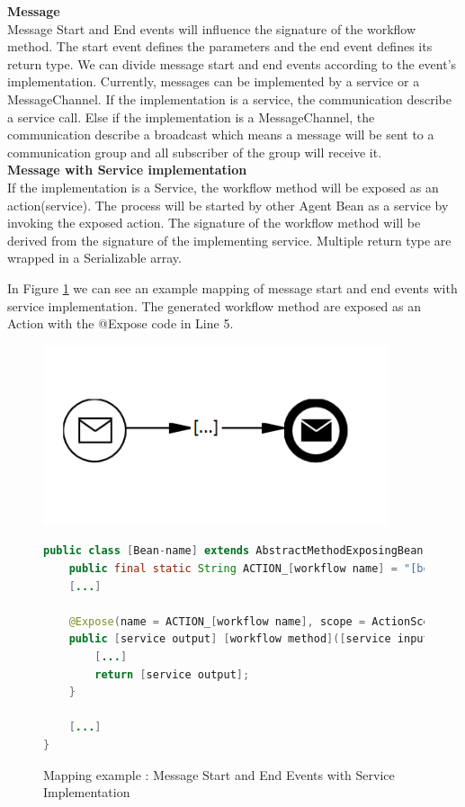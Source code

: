 \newpage
\textbf{Message}\\
Message Start and End events will influence the signature of the workflow method. The start event defines the parameters and the end event defines its return type. We can divide message start and end events according to the event's implementation. Currently, messages can be implemented by a service or a MessageChannel. If the implementation is a service, the communication describe a service call. Else if the implementation is a MessageChannel, the communication describe a broadcast which means a message will be sent to a communication group and all subscriber of the group will receive it. \\


\textbf{Message with Service implementation}\\
If the implementation is a Service, the workflow method will be exposed as an action(service). The process will be started by other Agent Bean as a service by invoking the exposed action. The signature of the workflow method will be derived from the signature of the implementing service. 
Multiple return type are wrapped in a Serializable array. 

In Figure \ref{fig:message_service} we can see an example mapping of message start and end events with service implementation. The generated workflow method are exposed as an Action with the @Expose code in Line 5. \\
\begin{figure}[h]
\begin{minipage}[c]{0.35\textwidth}
\includegraphics[width=0.9\textwidth]{images/mapping/messageStart.png}
\end{minipage}
\begin{minipage}[c]{0.65\textwidth}
\begin{lstlisting}[language = Java]
public class [Bean-name] extends AbstractMethodExposingBean{
	public final static String ACTION_[workflow name] = "[bean fullname]#[workflow method]"; 
	[...]
	
	@Expose(name = ACTION_[workflow name], scope = ActionScope.GLOBAL)
	public [service output] [workflow method]([service inputs]){
		[...]
		return [service output];
	}
	
	[...]
}
\end{lstlisting}
\end{minipage}
\caption{Mapping example : Message Start and End Events with Service Implementation}%
\label{fig:message_service}
\end{figure}

